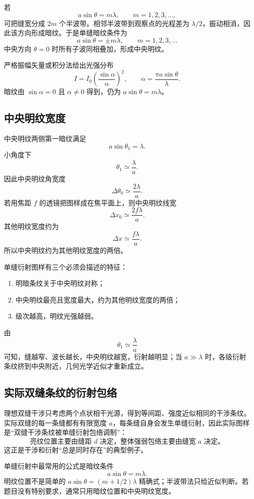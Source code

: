 若
\[
  a\sin\theta=m\lambda,\qquad m=1,2,3,\ldots,
\]
可把缝宽分成 $2m$ 个半波带。相邻半波带到观察点的光程差为 $\lambda/2$，振动相消，因此该方向形成暗纹。于是单缝暗纹条件为
\[
  a\sin\theta=\pm m\lambda,\qquad m=1,2,3,\ldots
\]
中央方向 $\theta=0$ 时所有子波同相叠加，形成中央明纹。

严格振幅矢量或积分法给出光强分布
\[
  I=I_0\left(\frac{\sin\alpha}{\alpha}\right)^2,\qquad
  \alpha=\frac{\pi a\sin\theta}{\lambda}.
\]
暗纹由 $\sin\alpha=0$ 且 $\alpha\ne0$ 得到，仍为 $a\sin\theta=m\lambda$。

\subsection*{中央明纹宽度}

中央明纹两侧第一暗纹满足
\[
  a\sin\theta_1=\lambda.
\]
小角度下
\[
  \theta_1\simeq\frac{\lambda}{a}.
\]
因此中央明纹角宽度
\[
  \Delta\theta_0\simeq\frac{2\lambda}{a}.
\]
若用焦距 $f$ 的透镜把图样成在焦平面上，则中央明纹线宽
\[
  \Delta x_0\simeq\frac{2f\lambda}{a}.
\]
其他明纹宽度约为
\[
  \Delta x\simeq\frac{f\lambda}{a}.
\]
所以中央明纹约为其他明纹宽度的两倍。

单缝衍射图样有三个必须会描述的特征：
\begin{enumerate}
  \item 明暗条纹关于中央明纹对称；
  \item 中央明纹最亮且宽度最大，约为其他明纹宽度的两倍；
  \item 级次越高，明纹光强越弱。
\end{enumerate}
由
\[
  \theta_1\simeq\frac{\lambda}{a}
\]
可知，缝越窄、波长越长，中央明纹越宽，衍射越明显；当 $a\gg\lambda$ 时，各级衍射条纹挤到中央附近，几何光学近似才重新成立。

\subsection*{实际双缝条纹的衍射包络}

理想双缝干涉只考虑两个点状相干光源，得到等间距、强度近似相同的干涉条纹。实际双缝的每一条缝都有有限宽度 $a$，每条缝自身会发生单缝衍射，因此实际图样是“双缝干涉条纹被单缝衍射包络调制”：
\[
  \text{亮纹位置主要由缝距 }d\text{ 决定，整体强弱包络主要由缝宽 }a\text{ 决定。}
\]
这正是干涉和衍射“总是同时存在”的典型例子。

\begin{pitfall}[单缝衍射的暗纹条件]
单缝衍射中最常用的公式是暗纹条件
\[
  a\sin\theta=m\lambda.
\]
明纹位置不是简单的 $a\sin\theta=(m+1/2)\lambda$ 精确式；半波带法只给近似判断。若题目没有特别要求，通常只用暗纹位置和中央明纹宽度。
\end{pitfall}

